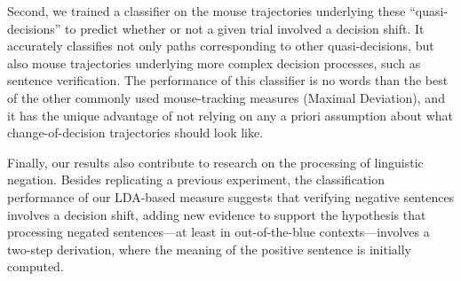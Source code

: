 \documentclass{article}
\begin{document}
Second, we trained a classifier on the mouse trajectories underlying these ``quasi-decisions'' to predict whether or not a given trial involved a decision shift. 
It accurately classifies not only paths corresponding to other quasi-decisions, but also mouse trajectories underlying more complex decision processes, such as sentence verification. The performance of this classifier is no words than the best of the other commonly used mouse-tracking measures (Maximal Deviation), and it has the unique advantage of not relying on any a priori assumption about what change-of-decision trajectories should look like.%

Finally, our results also contribute to research on the processing of linguistic negation. Besides replicating a previous experiment, the classification performance of our LDA-based measure suggests that verifying negative sentences involves a decision shift, adding new evidence to support the hypothesis that processing negated sentences---at least in out-of-the-blue contexts---involves a two-step derivation, where the meaning of the positive sentence is initially computed.  

%
    
    

\end{document}
